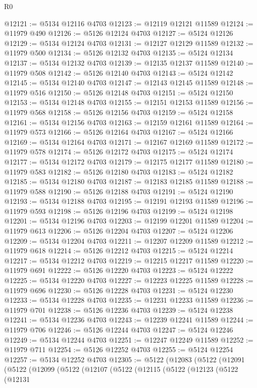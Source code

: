 \begin{lexlean}{R0}
\begin{coremodule}
@12121 := @5134 @12116 @4703
@12123 := @12119 @12121 @11589
@12124 := @11979 @490
@12126 := @5126 @12124 @4703
@12127 := @5124 @12126
@12129 := @5134 @12124 @4703
@12131 := @12127 @12129 @11589
@12132 := @11979 @500
@12134 := @5126 @12132 @4703
@12135 := @5124 @12134
@12137 := @5134 @12132 @4703
@12139 := @12135 @12137 @11589
@12140 := @11979 @508
@12142 := @5126 @12140 @4703
@12143 := @5124 @12142
@12145 := @5134 @12140 @4703
@12147 := @12143 @12145 @11589
@12148 := @11979 @516
@12150 := @5126 @12148 @4703
@12151 := @5124 @12150
@12153 := @5134 @12148 @4703
@12155 := @12151 @12153 @11589
@12156 := @11979 @568
@12158 := @5126 @12156 @4703
@12159 := @5124 @12158
@12161 := @5134 @12156 @4703
@12163 := @12159 @12161 @11589
@12164 := @11979 @573
@12166 := @5126 @12164 @4703
@12167 := @5124 @12166
@12169 := @5134 @12164 @4703
@12171 := @12167 @12169 @11589
@12172 := @11979 @578
@12174 := @5126 @12172 @4703
@12175 := @5124 @12174
@12177 := @5134 @12172 @4703
@12179 := @12175 @12177 @11589
@12180 := @11979 @583
@12182 := @5126 @12180 @4703
@12183 := @5124 @12182
@12185 := @5134 @12180 @4703
@12187 := @12183 @12185 @11589
@12188 := @11979 @588
@12190 := @5126 @12188 @4703
@12191 := @5124 @12190
@12193 := @5134 @12188 @4703
@12195 := @12191 @12193 @11589
@12196 := @11979 @593
@12198 := @5126 @12196 @4703
@12199 := @5124 @12198
@12201 := @5134 @12196 @4703
@12203 := @12199 @12201 @11589
@12204 := @11979 @613
@12206 := @5126 @12204 @4703
@12207 := @5124 @12206
@12209 := @5134 @12204 @4703
@12211 := @12207 @12209 @11589
@12212 := @11979 @618
@12214 := @5126 @12212 @4703
@12215 := @5124 @12214
@12217 := @5134 @12212 @4703
@12219 := @12215 @12217 @11589
@12220 := @11979 @691
@12222 := @5126 @12220 @4703
@12223 := @5124 @12222
@12225 := @5134 @12220 @4703
@12227 := @12223 @12225 @11589
@12228 := @11979 @696
@12230 := @5126 @12228 @4703
@12231 := @5124 @12230
@12233 := @5134 @12228 @4703
@12235 := @12231 @12233 @11589
@12236 := @11979 @701
@12238 := @5126 @12236 @4703
@12239 := @5124 @12238
@12241 := @5134 @12236 @4703
@12243 := @12239 @12241 @11589
@12244 := @11979 @706
@12246 := @5126 @12244 @4703
@12247 := @5124 @12246
@12249 := @5134 @12244 @4703
@12251 := @12247 @12249 @11589
@12252 := @11979 @711
@12254 := @5126 @12252 @4703
@12255 := @5124 @12254
@12257 := @5134 @12252 @4703
@12305 := @5122
    (@12083
      (@5122
        (@12091
          (@5122
            (@12099
              (@5122
                (@12107
                  (@5122
                    (@12115
                      (@5122
                        (@12123
                          (@5122
                            (@12131

\end{coremodule}
\end{lexlean}
